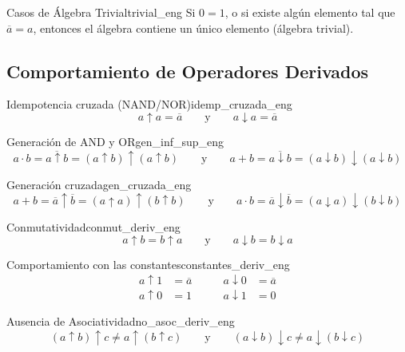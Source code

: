 \documentclass[12pt,a4paper]{article}
\begin{document}
\setcounter{tcb@cnt@teorema}{3}
\begin{teorema}{Casos de Álgebra Trivial}{trivial_eng}
Si $0 = 1$, o si existe algún elemento tal que $\overline{a} = a$, entonces el álgebra contiene un único elemento (álgebra trivial).
\end{teorema}

\subsection*{Comportamiento de Operadores Derivados}

\setcounter{tcb@cnt@teorema}{13}
\begin{teorema}{Idempotencia cruzada (NAND/NOR)}{idemp_cruzada_eng}
\[ a \uparrow a = \overline{a} \qquad \text{y} \qquad a \downarrow a = \overline{a} \]
\end{teorema}

\setcounter{tcb@cnt@teorema}{14}
\begin{teorema}{Generación de AND y OR}{gen_inf_sup_eng}
\[ a \cdot b = \overline{a \uparrow b} = (a \uparrow b) \uparrow (a \uparrow b) \qquad \text{y} \qquad a + b = \overline{a \downarrow b} = (a \downarrow b) \downarrow (a \downarrow b) \]
\end{teorema}

\setcounter{tcb@cnt@teorema}{15}
\begin{teorema}{Generación cruzada}{gen_cruzada_eng}
\[ a + b = \overline{a} \uparrow \overline{b} = (a \uparrow a) \uparrow (b \uparrow b) \qquad \text{y} \qquad a \cdot b = \overline{a} \downarrow \overline{b} = (a \downarrow a) \downarrow (b \downarrow b) \]
\end{teorema}

\setcounter{tcb@cnt@teorema}{16}
\begin{teorema}{Conmutatividad}{conmut_deriv_eng}
\[ a \uparrow b = b \uparrow a \qquad \text{y} \qquad a \downarrow b = b \downarrow a \]
\end{teorema}

\setcounter{tcb@cnt@teorema}{18}
\begin{teorema}{Comportamiento con las constantes}{constantes_deriv_eng}
\begin{align*}
    a \uparrow 1 &= \overline{a} \qquad & a \downarrow 0 &= \overline{a} \\
    a \uparrow 0 &= 1 \qquad & a \downarrow 1 &= 0
\end{align*}
\end{teorema}

\setcounter{tcb@cnt@teorema}{19}
\begin{teorema}{Ausencia de Asociatividad}{no_asoc_deriv_eng}
\[ (a \uparrow b) \uparrow c \neq a \uparrow (b \uparrow c) \qquad \text{y} \qquad (a \downarrow b) \downarrow c \neq a \downarrow (b \downarrow c) \]
\end{teorema}
\end{document}
